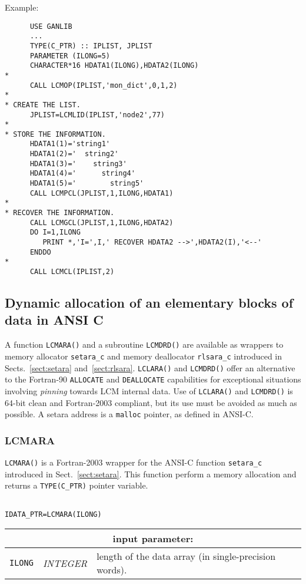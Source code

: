 \vskip 0.4cm

\noindent Example:
\begin{verbatim}
      USE GANLIB
      ...
      TYPE(C_PTR) :: IPLIST, JPLIST
      PARAMETER (ILONG=5)
      CHARACTER*16 HDATA1(ILONG),HDATA2(ILONG)
*
      CALL LCMOP(IPLIST,'mon_dict',0,1,2)
*
* CREATE THE LIST.
      JPLIST=LCMLID(IPLIST,'node2',77)
*
* STORE THE INFORMATION.
      HDATA1(1)='string1'
      HDATA1(2)='  string2'
      HDATA1(3)='    string3'
      HDATA1(4)='      string4'
      HDATA1(5)='        string5'
      CALL LCMPCL(JPLIST,1,ILONG,HDATA1)
*
* RECOVER THE INFORMATION.
      CALL LCMGCL(JPLIST,1,ILONG,HDATA2)
      DO I=1,ILONG
         PRINT *,'I=',I,' RECOVER HDATA2 -->',HDATA2(I),'<--'
      ENDDO
*
      CALL LCMCL(IPLIST,2)
\end{verbatim}

\vskip 0.8cm

\subsection{Dynamic allocation of an elementary blocks of data in ANSI C}

A function {\tt LCMARA()} and a subroutine {\tt LCMDRD()} are available as wrappers to memory allocator
{\tt setara\_c} and memory deallocator {\tt rlsara\_c} introduced in Sects.~\ref{sect:setara} and~\ref{sect:rlsara}.
{\tt LCLARA()} and {\tt LCMDRD()} offer an alternative to the Fortran-90 {\tt ALLOCATE} and {\tt DEALLOCATE}
capabilities for exceptional situations involving {\sl pinning} towards LCM internal data. Use of {\tt LCLARA()}
and {\tt LCMDRD()} is 64-bit clean and Fortran-2003 compliant, but its use must be avoided as much as possible. A
setara address is a {\tt malloc} pointer, as defined in ANSI-C.

\subsubsection{LCMARA}\label{sect:LCMARA}

{\tt LCMARA()} is a Fortran-2003 wrapper for the ANSI-C function {\tt setara\_c} introduced in Sect.~\ref{sect:setara}. This function
perform a memory allocation and returns a {\tt TYPE(C\_PTR)} pointer variable.

\begin{verbatim}

IDATA_PTR=LCMARA(ILONG)
\end{verbatim}

\noindent
\begin{tabular}{|p{1.5cm}|p{3cm}|p{10cm}|}
\hline
\multicolumn{3}{|c|}{\bf input parameter:} \\
\hline
{\tt ILONG} & {\it INTEGER} & length of the data array (in single-precision words). \\
\hline
\end{tabular}


